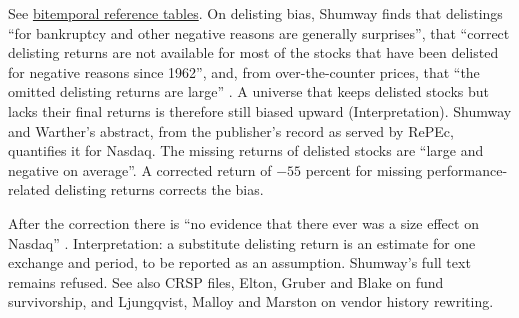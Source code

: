 \begin{qfdata}
 See \hyperref[meth:bitemporal-reference-tables]{bitemporal reference tables}. On delisting bias, Shumway finds that delistings ``for bankruptcy and other negative reasons are generally surprises'', that ``correct delisting returns are not available for most of the stocks that have been delisted for negative reasons since 1962'', and, from over-the-counter prices, that ``the omitted delisting returns are large'' \citep[abstract]{wide-shumway-delisting}. A universe that keeps delisted stocks but lacks their final returns is therefore still biased upward (Interpretation). Shumway and Warther's abstract, from the publisher's record as served by RePEc, quantifies it for Nasdaq. The missing returns of delisted stocks are ``large and negative on average''. A corrected return of $-55$ percent for missing performance-related delisting returns corrects the bias.

After the correction there is ``no evidence that there ever was a size effect on Nasdaq'' \citep[abstract]{shumway-warther-1999}. Interpretation: a substitute delisting return is an estimate for one exchange and period, to be reported as an assumption. Shumway's full text remains refused. See also CRSP files, Elton, Gruber and Blake on fund survivorship, and Ljungqvist, Malloy and Marston on vendor history rewriting.

\end{qfdata}

